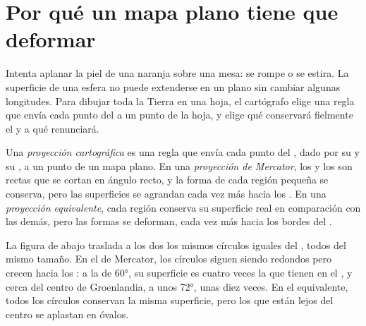 \section{Por qué un mapa plano tiene que deformar}

Intenta aplanar la piel de una naranja sobre una mesa: se rompe o se
estira. La superficie de una esfera no puede extenderse en un plano sin
cambiar algunas longitudes. Para dibujar toda la Tierra en una hoja, el
cartógrafo elige una regla que envía cada punto del  a un punto de la
hoja, y elige qué conservará fielmente el  y a qué renunciará.

\begin{definition}\label{def:g9:maps-of-the-earth:projection}
Una \emph{proyección cartográfica}
es una regla que envía cada punto del , dado por su  y su
, a un punto de un mapa plano. En una \emph{proyección de
Mercator}, los
 y los  son rectas que se cortan en ángulo recto, y la
forma de cada región pequeña se conserva, pero las superficies se agrandan
cada vez más hacia los . En una \emph{proyección
equivalente}, cada
región conserva su superficie real en comparación con las demás, pero las
formas se deforman, cada vez más hacia los bordes del .
\end{definition}

La figura de abajo traslada a los dos  los mismos círculos iguales
del , todos del mismo tamaño. En el  de Mercator, los círculos
siguen siendo redondos pero crecen hacia los : a la  de
\ang{60}, su superficie es cuatro veces la que tienen en el , y
cerca del centro de Groenlandia, a unos \ang{72}, unas diez veces. En el
 equivalente, todos los círculos conservan la misma superficie, pero
los que están lejos del centro se aplastan en óvalos.

